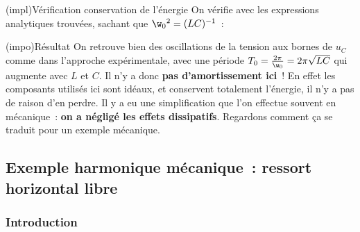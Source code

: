 \documentclass[../../main/main.tex]{subfiles}
\begin{document}
\begin{tcb}[label=impl](impl){Vérification conservation de l'énergie}
	On vérifie avec les expressions analytiques trouvées, sachant que
	$\w_0{}^2 = (LC)^{-1}$~:
\end{tcb}
\begin{tcb}[label=impo:amortissement](impo){Résultat}
	On retrouve bien des oscillations de la tension aux bornes de $u_C$ comme dans
	l'approche expérimentale, avec une période $T_0 = \frac{2\pi}{\w_0} =
		2\pi\sqrt{LC}$ qui augmente avec $L$ et $C$.
	\bigbreak
	Il n'y a donc \textbf{pas d'amortissement ici}~! En effet les composants
	utilisés ici sont idéaux, et conservent totalement l'énergie, il n'y a pas de
	raison d'en perdre.
	\bigbreak
	Il y a eu une simplification que l'on effectue souvent en mécanique~:
	\textbf{on a négligé les effets dissipatifs}. Regardons comment ça se traduit
	pour un exemple mécanique.
\end{tcb}

\subsection{Exemple harmonique mécanique~: ressort horizontal libre}

\subsubsection{Introduction}
\end{document}
